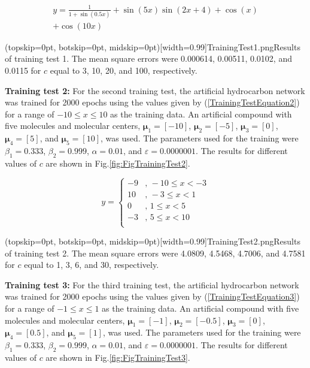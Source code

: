 \documentclass{ieeeaccess}
\begin{document}
\begin{equation}\label{TrainingTestEquation1}
\begin{matrix}
y=\frac{1}{1 +\sin(0.5x)}+\sin(5x)\sin{(2x + 4)}+\cos(x)\\
+\cos(10x)
\end{matrix}
\end{equation}

\Figure[ht!](topskip=0pt, botskip=0pt, midskip=0pt)[width=0.99\columnwidth]{TrainingTest1.png}{Results of training test 1. The mean square errors were 0.000614, 0.00511, 0.0102, and 0.0115 for \(c\) equal to 3, 10, 20, and 100, respectively\label{fig:FigTrainingTest1}.}

\textbf{Training test 2:} For the second training test, the artificial hydrocarbon network was trained for 2000 epochs using the values given by (\ref{TrainingTestEquation2}) for a range of \(-10\le x\le10\) as the training data. An artificial compound with five molecules and molecular centers, \(\mathbf{\mu}_1=\left[-10\right]\), \(\mathbf{\mu}_2=\left[-5\right]\), \(\mathbf{\mu}_3=\left[0\right]\), \(\mathbf{\mu}_4=[5]\), and \(\mathbf{\mu}_5=[10]\), was used. The parameters used for the training were \(\beta_1=0.333\), \(\beta_2=0.999\), \(\alpha=0.01\), and \(\varepsilon=0.0000001\). The results for different values of \(c\) are shown in Fig.\ref{fig:FigTrainingTest2}.

\begin{equation}\label{TrainingTestEquation2}
	y=
 \begin{cases}
 -9 &,\, -10\le x<-3\\
 10 &,\, -3\le x<1\\
 0 &,\, 1\le x<5\\
 -3 &,\, 5\le x<10\\
 \end{cases}
\end{equation}

\Figure[ht!](topskip=0pt, botskip=0pt, midskip=0pt)[width=0.99\columnwidth]{TrainingTest2.png}{Results of training test 2. The mean square errors were 4.0809, 4.5468, 4.7006, and 4.7581 for \(c\) equal to 1, 3, 6, and 30, respectively\label{fig:FigTrainingTest2}.}

\textbf{Training test 3:} For the third training test, the artificial hydrocarbon network was trained for 2000 epochs using the values given by (\ref{TrainingTestEquation3}) for a range of \(-1\le x\le1\) as the training data. An artificial compound with five molecules and molecular centers, \(\mathbf{\mu}_1=\left[-1\right]\), \(\mathbf{\mu}_2=\left[-0.5\right]\), \(\mathbf{\mu}_3=\left[0\right]\), \(\mathbf{\mu}_4=[0.5]\), and \(\mathbf{\mu}_5=[1]\), was used. The parameters used for the training were \(\beta_1=0.333\), \(\beta_2=0.999\), \(\alpha=0.01\), and \(\varepsilon=0.0000001\). The results for different values of \(c\) are shown in Fig.\ref{fig:FigTrainingTest3}.
\end{document}

